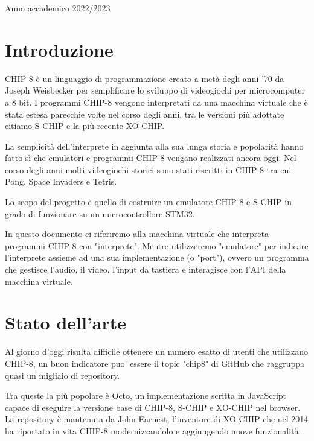 \documentclass[a4paper]{article}
\begin{document}
\begin{titlepage}
\begin{center}
        \vfill
        Anno accademico 2022/2023

    \end{center}
\end{titlepage}
\setlength{\parindent}{0pt}
\setlength{\parskip}{0.8em}

\tableofcontents
\listoffigures
\listoftables

\newpage

\section{Introduzione}


CHIP-8 è un linguaggio di programmazione creato a metà degli anni '70
da Joseph Weisbecker per semplificare lo sviluppo di videogiochi per
microcomputer a 8 bit. I programmi CHIP-8 vengono interpretati da una
macchina virtuale che è stata estesa parecchie volte nel corso degli
anni, tra le versioni più adottate citiamo S-CHIP e la più recente
XO-CHIP.

La semplicità dell'interprete in aggiunta alla sua lunga storia e
popolarità hanno fatto sì che emulatori e programmi CHIP-8 vengano
realizzati ancora oggi.
Nel corso degli anni molti videogiochi storici sono stati riscritti
in CHIP-8 tra cui Pong, Space Invaders e Tetris.

Lo scopo del progetto è quello di costruire un emulatore CHIP-8 e
S-CHIP in grado di funzionare su un microcontrollore STM32.

In questo documento ci riferiremo alla macchina virtuale che
interpreta programmi CHIP-8 con "interprete". Mentre utilizzeremo
"emulatore" per indicare l'interprete assieme ad una sua
implementazione (o "port"), ovvero un programma che gestisce
l'audio, il video, l'input da tastiera e interagisce con l'API della
macchina virtuale.

\section{Stato dell'arte}

Al giorno d'oggi risulta difficile ottenere un numero esatto di utenti che utilizzano CHIP-8, un buon indicatore puo' essere il topic "chip8" di GitHub che raggruppa quasi un migliaio di repository.

Tra queste la più popolare è Octo, un'implementazione scritta in JavaScript capace di eseguire la versione base di CHIP-8, S-CHIP e XO-CHIP nel browser. La repository è mantenuta da John Earnest, l'inventore di XO-CHIP che nel 2014 ha riportato in vita CHIP-8 modernizzandolo e aggiungendo nuove funzionalità.
\end{document}
